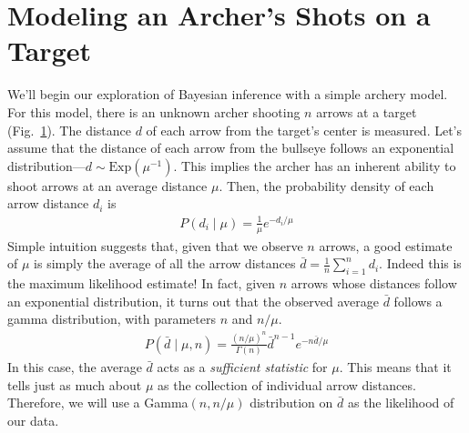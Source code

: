 \section{Modeling an Archer's Shots on a Target}\label{sect:Exercise}

\begin{figure}[h!]
\centering
{}
\label{fig:archery_model}
\end{figure}

We'll begin our exploration of Bayesian inference with a simple archery model.
For this model, there is an unknown archer shooting $n$ arrows at a target (Fig.\ \ref{fig:archery_model}). 
The distance $d$ of each arrow from the target's center is measured.
Let's assume that the distance of each arrow from the bullseye follows an exponential distribution---\IE $d\sim\mbox{Exp}(\mu^{-1})$.
This implies the archer has an inherent ability to shoot arrows at an average distance $\mu$.
Then, the probability density of each arrow distance $d_i$ is
\begin{align*}
P(d_i \mid \mu) = \frac{1}{\mu} e^{-d_i/\mu}
\end{align*}
Simple intuition suggests that, given that we observe $n$ arrows, a good estimate of $\mu$ is simply the average of all the arrow distances $\bar d = \frac{1}{n}\sum_{i=1}^n d_i$.
Indeed this is the maximum likelihood estimate!
In fact, given $n$ arrows whose distances follow an exponential distribution, it turns out that the observed average $\bar d$ follows a gamma distribution, with parameters $n$ and $n/\mu$.
\begin{align*}
P(\bar d \mid \mu,n) = \frac{(n/\mu)^n}{\Gamma(n)} {\bar d}^{n-1}e^{-n\bar d /\mu}
\end{align*}
In this case, the average $\bar d$ acts as a \emph{sufficient statistic} for $\mu$. This means that it tells just as much about $\mu$ as the collection of individual arrow distances.
Therefore, we will use a Gamma$(n, n/\mu)$ distribution on $\bar d$ as the likelihood of our data.

